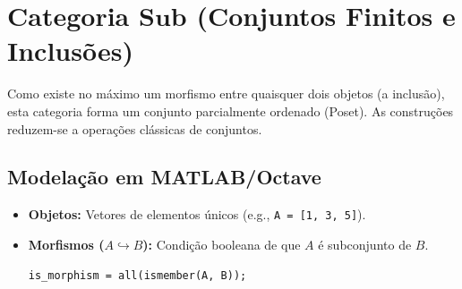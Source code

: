 \documentclass[11pt,a4paper]{article}
\begin{document}
\section{Categoria $\mathbf{Sub}$ (Conjuntos Finitos e Inclusões)}

Como existe no máximo um morfismo entre quaisquer dois objetos (a inclusão), esta categoria forma um conjunto parcialmente ordenado (Poset). As construções reduzem-se a operações clássicas de conjuntos.

\subsection{Modelação em MATLAB/Octave}
\begin{itemize}
    \item \textbf{Objetos:} Vetores de elementos únicos (e.g., \texttt{A = [1, 3, 5]}).
    \item \textbf{Morfismos ($A \hookrightarrow B$):} Condição booleana de que $A$ é subconjunto de $B$.
\begin{lstlisting}
is_morphism = all(ismember(A, B));
\end{lstlisting}
\end{itemize}
\end{document}
